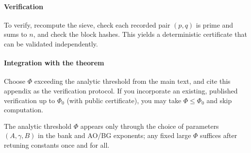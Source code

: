 \paragraph{Verification}
To verify, recompute the sieve, check each recorded pair $(p,q)$ is prime and sums to $n$, and check the block hashes. This yields a deterministic certificate that can be validated independently.

\paragraph{Integration with the theorem}
Choose $\Phi$ exceeding the analytic threshold from the main text, and cite this appendix as the verification protocol. If you incorporate an existing, published verification up to $\Phi_0$ (with public certificate), you may take $\Phi\le \Phi_0$ and skip computation.

\begin{remark}
The analytic threshold $\Phi$ appears only through the choice of parameters $(A,\gamma,B)$ in the bank and AO/BG exponents; any fixed large $\Phi$ suffices after retuning constants once and for all.
\end{remark}


